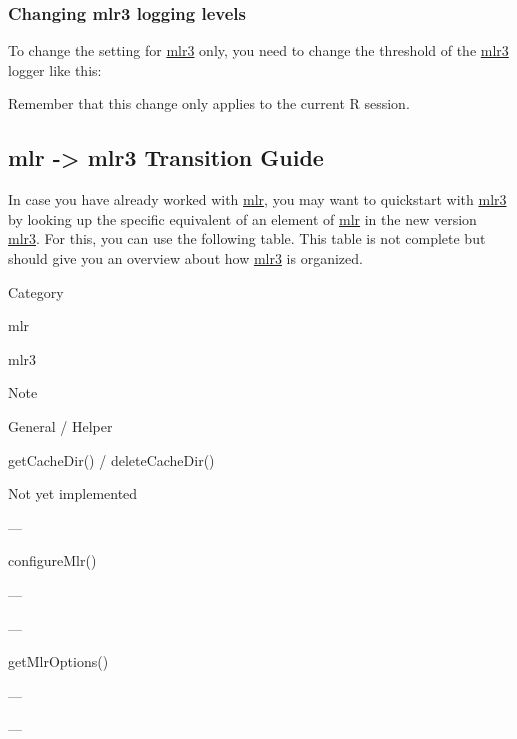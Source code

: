 \documentclass[]{article}
\newenvironment{Shaded}{\begin{snugshade}}{\end{snugshade}}
\newcommand{\KeywordTok}[1]{\textcolor[rgb]{0.13,0.29,0.53}{\textbf{#1}}}
\newcommand{\NormalTok}[1]{#1}
\newcommand{\OperatorTok}[1]{\textcolor[rgb]{0.81,0.36,0.00}{\textbf{#1}}}
\newcommand{\StringTok}[1]{\textcolor[rgb]{0.31,0.60,0.02}{#1}}
\renewenvironment{Shaded} {\begin{snugshade}\small} {\end{snugshade}}
\begin{document}
\hypertarget{changing-mlr3-logging-levels}{%
\subsubsection{Changing mlr3 logging levels}\label{changing-mlr3-logging-levels}}

To change the setting for \href{https://mlr3.mlr-org.com}{mlr3} only, you need to change the threshold of the \href{https://mlr3.mlr-org.com}{mlr3} logger like this:

\begin{Shaded}
\end{Shaded}

Remember that this change only applies to the current R session.

\hypertarget{transition}{%
\subsection{mlr -\textgreater{} mlr3 Transition Guide}\label{transition}}

In case you have already worked with \href{https://mlr.mlr-org.com}{mlr}, you may want to quickstart with \href{https://mlr3.mlr-org.com}{mlr3} by looking up the specific equivalent of an element of \href{https://mlr.mlr-org.com}{mlr} in the new version \href{https://mlr3.mlr-org.com}{mlr3}.
For this, you can use the following table.
This table is not complete but should give you an overview about how \href{https://mlr3.mlr-org.com}{mlr3} is organized.

Category

mlr

mlr3

Note

General / Helper

getCacheDir() / deleteCacheDir()

Not yet implemented

---

configureMlr()

---

---

getMlrOptions()

---

---
\end{document}
